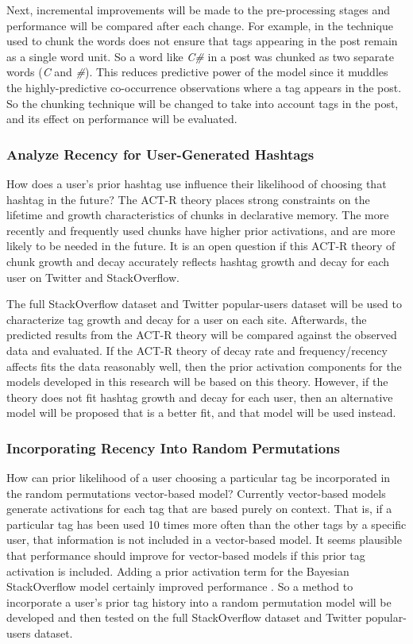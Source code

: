 \documentclass[man,floatsintext]{apa6}
\begin{document}
Next, incremental improvements will be made to the pre-processing stages and performance will be compared after each change.
For example, in \textcite{Stanley2013} the technique used to chunk the words does not ensure that tags appearing in the post remain as a single word unit.
So a word like \emph{C\#} in a post was chunked as two separate words (\emph{C} and \emph{\#}).
This reduces predictive power of the model since it muddles the highly-predictive co-occurrence observations where a tag appears in the post.
So the chunking technique will be changed to take into account tags in the post, and its effect on performance will be evaluated.

\subsubsection{Analyze Recency for User-Generated Hashtags}

How does a user's prior hashtag use influence their likelihood of choosing that hashtag in the future?
The ACT-R theory places strong constraints on the lifetime and growth characteristics of chunks in declarative memory.
The more recently and frequently used chunks have higher prior activations, and are more likely to be needed in the future.
It is an open question if this ACT-R theory of chunk growth and decay accurately reflects hashtag growth and decay for each user on Twitter and StackOverflow.

The full StackOverflow dataset and Twitter popular-users dataset will be used to characterize tag growth and decay for a user on each site.
Afterwards, the predicted results from the ACT-R theory will be compared against the observed data and evaluated.
If the ACT-R theory of decay rate and frequency/recency affects fits the data reasonably well, then the prior activation components for the models developed in this research will be based on this theory.
However, if the theory does not fit hashtag growth and decay for each user, then an alternative model will be proposed that is a better fit, and that model will be used instead.

\subsubsection{Incorporating Recency Into Random Permutations}

How can prior likelihood of a user choosing a particular tag be incorporated in the random permutations vector-based model?
Currently vector-based models generate activations for each tag that are based purely on context.
That is, if a particular tag has been used 10 times more often than the other tags by a specific user, that information is not included in a vector-based model.
It seems plausible that performance should improve for vector-based models if this prior tag activation is included.
Adding a prior activation term for the Bayesian StackOverflow model certainly improved performance \parencite{Stanley2013}.
So a method to incorporate a user's prior tag history into a random permutation model will be developed and then tested on the full StackOverflow dataset and Twitter popular-users dataset.
\end{document}
